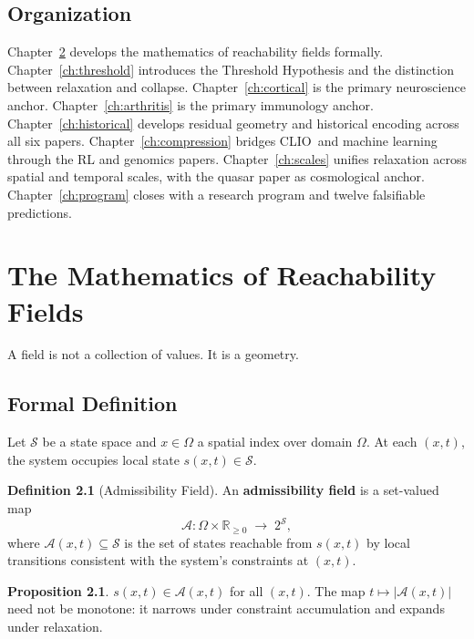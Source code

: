 \documentclass[12pt, a4paper, twoside]{book}
\theoremstyle{definition}
\newtheorem{definition}{Definition}[chapter]
\newtheorem{proposition}{Proposition}[chapter]
\theoremstyle{remark}
\newcommand{\Adm}{\mathcal{A}}
\newcommand{\Spc}{\mathcal{S}}
\newcommand{\term}[1]{\textbf{#1}}
\newcommand{\CLIO}{\textsf{CLIO}}
\begin{document}
\section{Organization}

Chapter~\ref{ch:math} develops the mathematics of reachability fields formally. Chapter~\ref{ch:threshold} introduces the Threshold Hypothesis and the distinction between relaxation and collapse. Chapter~\ref{ch:cortical} is the primary neuroscience anchor. Chapter~\ref{ch:arthritis} is the primary immunology anchor. Chapter~\ref{ch:historical} develops residual geometry and historical encoding across all six papers. Chapter~\ref{ch:compression} bridges \CLIO\ and machine learning through the RL and genomics papers. Chapter~\ref{ch:scales} unifies relaxation across spatial and temporal scales, with the quasar paper as cosmological anchor. Chapter~\ref{ch:program} closes with a research program and twelve falsifiable predictions.

\chapter{The Mathematics of Reachability Fields}
\label{ch:math}

\epigraph{A field is not a collection of values. It is a geometry.}{}

\section{Formal Definition}

Let $\Spc$ be a state space and $x \in \Omega$ a spatial index over domain $\Omega$. At each $(x,t)$, the system occupies local state $s(x,t) \in \Spc$.

\begin{definition}[Admissibility Field]
\label{def:adm-formal}
An \term{admissibility field} is a set-valued map
\begin{equation}
  \Adm : \Omega \times \mathbb{R}_{\geq 0} \;\longrightarrow\; 2^{\Spc},
\end{equation}
where $\Adm(x,t) \subseteq \Spc$ is the set of states reachable from $s(x,t)$ by local transitions consistent with the system's constraints at $(x,t)$.
\end{definition}

\begin{proposition}
$s(x,t) \in \Adm(x,t)$ for all $(x,t)$. The map $t \mapsto |\Adm(x,t)|$ need not be monotone: it narrows under constraint accumulation and expands under relaxation.
\end{proposition}
\end{document}
